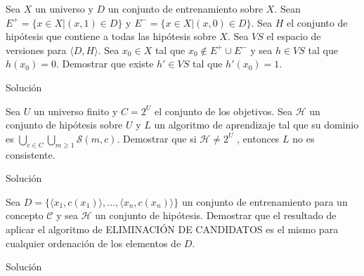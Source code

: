 \documentclass{mulcia_aa}
\begin{document}
\genTitle
\genAdvice

\begin{problem}
Sea $X$ un universo y $D$ un conjunto de entrenamiento sobre $X$. Sean $E^+ = \{ x \in X |(x, 1) \in D \}$ y $E^- = \{x \in X |(x, 0) \in D\}$. Sea $H$ el conjunto de hipótesis que contiene a todas las hipótesis sobre $X$. Sea $VS$ el espacio de versiones para $ \langle D, H \rangle$. Sea $x_0 \in X$ tal que $x_0 \not\in E^+ \cup E^- $ y sea $h \in VS$ tal que $h(x_0) = 0$. Demostrar que existe $h' \in VS$ tal que $h'(x_0) = 1$.
\end{problem}
\begin{solution}
Solución
\end{solution}

\begin{problem}
Sea $U$ un universo finito y $C = 2^U$ el conjunto de los objetivos. Sea $\mathcal{H}$ un conjunto de hipótesis sobre $U$ y $L$ un algoritmo de aprendizaje tal que su dominio es $\bigcup_{c \in C}\bigcup_{m \geq 1} \mathcal{S}(m, c)$. Demostrar que si $\mathcal{H} \not= 2^U$ , entonces $L$ no es consistente.
\end{problem}
\begin{solution}
Solución
\end{solution}

\begin{problem}
Sea $D = \{\langle x_1, c(x_1)\rangle, . . . ,\langle x_n, c(x_n)\rangle\}$ un conjunto de entrenamiento para un concepto $\mathcal{C}$ y sea $\mathcal{H}$ un conjunto de hipótesis. Demostrar que el resultado de aplicar el algoritmo de ELIMINACIÓN DE CANDIDATOS es el mismo para cualquier ordenación de los elementos de $D$.
\end{problem}
\begin{solution}
Solución
\end{solution}
 
\end{document}
